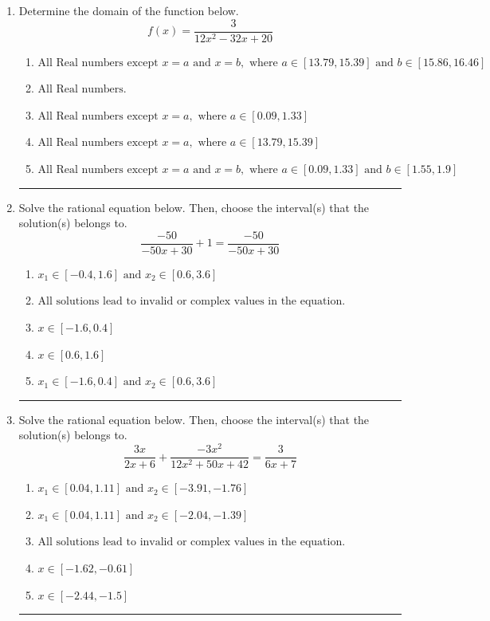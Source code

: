 \documentclass[14pt]{extbook}
\newcommand{\litem}[1]{\item#1\hspace*{-1cm}\rule{\textwidth}{0.4pt}}
\begin{document}
\begin{enumerate}
\litem{
Determine the domain of the function below.\[ f(x) = \frac{3}{12x^{2} -32 x + 20} \]\begin{enumerate}[label=\Alph*.]
\item \( \text{All Real numbers except } x = a \text{ and } x = b, \text{ where } a \in [13.79, 15.39] \text{ and } b \in [15.86, 16.46] \)
\item \( \text{All Real numbers.} \)
\item \( \text{All Real numbers except } x = a, \text{ where } a \in [0.09, 1.33] \)
\item \( \text{All Real numbers except } x = a, \text{ where } a \in [13.79, 15.39] \)
\item \( \text{All Real numbers except } x = a \text{ and } x = b, \text{ where } a \in [0.09, 1.33] \text{ and } b \in [1.55, 1.9] \)

\end{enumerate} }
\litem{
Solve the rational equation below. Then, choose the interval(s) that the solution(s) belongs to.\[ \frac{-50}{-50x + 30} + 1 = \frac{-50}{-50x + 30} \]\begin{enumerate}[label=\Alph*.]
\item \( x_1 \in [-0.4, 1.6] \text{ and } x_2 \in [0.6,3.6] \)
\item \( \text{All solutions lead to invalid or complex values in the equation.} \)
\item \( x \in [-1.6,0.4] \)
\item \( x \in [0.6,1.6] \)
\item \( x_1 \in [-1.6, 0.4] \text{ and } x_2 \in [0.6,3.6] \)

\end{enumerate} }
\litem{
Solve the rational equation below. Then, choose the interval(s) that the solution(s) belongs to.\[ \frac{3x}{2x + 6} + \frac{-3x^{2}}{12x^{2} +50 x + 42} = \frac{3}{6x + 7} \]\begin{enumerate}[label=\Alph*.]
\item \( x_1 \in [0.04, 1.11] \text{ and } x_2 \in [-3.91,-1.76] \)
\item \( x_1 \in [0.04, 1.11] \text{ and } x_2 \in [-2.04,-1.39] \)
\item \( \text{All solutions lead to invalid or complex values in the equation.} \)
\item \( x \in [-1.62,-0.61] \)
\item \( x \in [-2.44,-1.5] \)


\end{enumerate}}
\end{enumerate}
\end{document}
